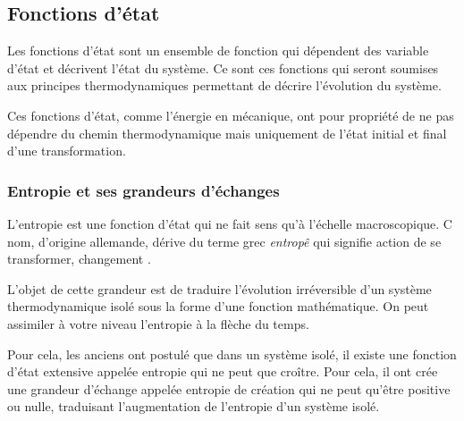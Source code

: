 
\subsection{Fonctions d'état}
Les fonctions d'état sont un ensemble de fonction qui dépendent des variable d'état et décrivent l'état du système. Ce sont ces fonctions qui seront soumises aux principes thermodynamiques permettant de décrire l'évolution du système.

Ces fonctions d'état, comme l'énergie en mécanique, ont pour propriété de ne pas dépendre du chemin thermodynamique mais uniquement de l'état initial et final d'une transformation.

\subsubsection{Entropie et ses grandeurs d'échanges}

L'entropie est une fonction d'état qui ne fait sens qu'à l'échelle macroscopique. C nom, d'origine allemande, dérive du terme grec \emph{entropê} qui signifie \og action de se transformer, changement \fg{}.

L'objet de cette grandeur est de traduire l'évolution irréversible d'un système thermodynamique isolé sous la forme d'une fonction mathématique. On peut assimiler à votre niveau l'entropie à la flèche du temps.

Pour cela, les anciens ont postulé que dans un système isolé, il existe une fonction d'état extensive appelée entropie qui ne peut que croître. Pour cela, il ont crée une grandeur d'échange appelée \og entropie de création \fg{} qui ne peut qu'être positive ou nulle, traduisant l'augmentation de l'entropie d'un système isolé.


